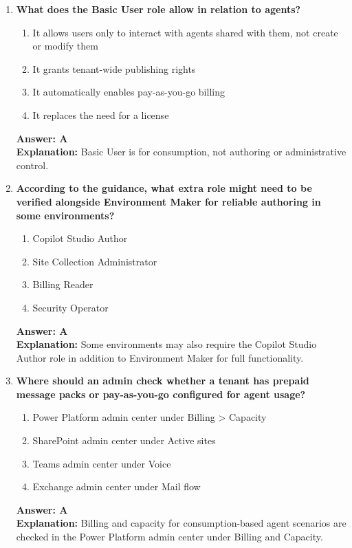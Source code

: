 \documentclass[10pt]{article}
\begin{document}
\begin{enumerate}[leftmargin=*]
\item \textbf{What does the Basic User role allow in relation to agents?}
\begin{enumerate}[label=\Alph*.]
  \item It allows users only to interact with agents shared with them, not create or modify them
  \item It grants tenant-wide publishing rights
  \item It automatically enables pay-as-you-go billing
  \item It replaces the need for a license
\end{enumerate}
\textbf{Answer: A}\\
\textbf{Explanation:} Basic User is for consumption, not authoring or administrative control.

\item \textbf{According to the guidance, what extra role might need to be verified alongside Environment Maker for reliable authoring in some environments?}
\begin{enumerate}[label=\Alph*.]
  \item Copilot Studio Author
  \item Site Collection Administrator
  \item Billing Reader
  \item Security Operator
\end{enumerate}
\textbf{Answer: A}\\
\textbf{Explanation:} Some environments may also require the Copilot Studio Author role in addition to Environment Maker for full functionality.

\item \textbf{Where should an admin check whether a tenant has prepaid message packs or pay-as-you-go configured for agent usage?}
\begin{enumerate}[label=\Alph*.]
  \item Power Platform admin center under Billing > Capacity
  \item SharePoint admin center under Active sites
  \item Teams admin center under Voice
  \item Exchange admin center under Mail flow
\end{enumerate}
\textbf{Answer: A}\\
\textbf{Explanation:} Billing and capacity for consumption-based agent scenarios are checked in the Power Platform admin center under Billing and Capacity.


\end{enumerate}
\end{document}
